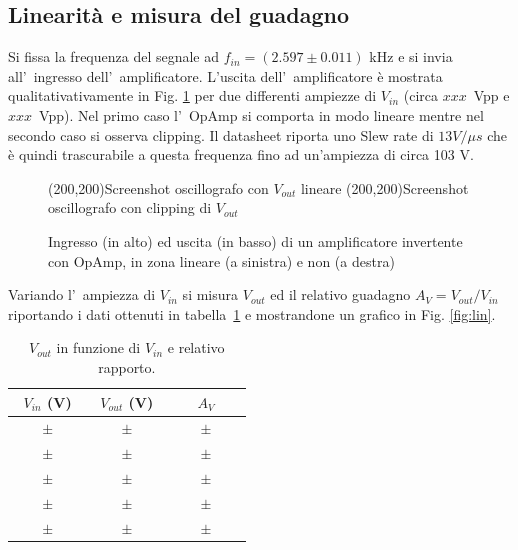 \documentclass[10pt,a4paper]{article}
\newcommand{\exn}{\phantom{xxx}}
\begin{document}
	\subsection{Linearit\`a e misura del guadagno}
	Si fissa la frequenza del segnale ad $f_{in} = (2.597 \pm 0.011)$ kHz e si invia all'~ingresso dell'~amplificatore.	L'uscita dell'~amplificatore \`e mostrata qualitativativamente in Fig. \ref{fig:oscinv} per due 
	differenti ampiezze di $V_{in}$ (circa $xxx$~Vpp e $xxx$~Vpp). 
	Nel primo caso l'~OpAmp si comporta in modo lineare mentre nel secondo caso si osserva clipping. Il datasheet riporta uno Slew rate di $13 V/\mu s$ che è quindi trascurabile a questa frequenza fino ad un'ampiezza di circa 103 V.
	\begin{figure}[h]
		\begin{center}
			\framebox(200,200){Screenshot oscillografo con $V_{out}$ lineare}
			\framebox(200,200){Screenshot oscillografo con clipping di $V_{out}$}
		\end{center}
		\caption{\small Ingresso (in alto) ed uscita (in basso) di un amplificatore invertente con OpAmp, in 
			zona lineare (a sinistra) e non (a destra)}
		\label{fig:oscinv}
	\end{figure}
	
	Variando l'~ampiezza di $V_{in}$ si misura $V_{out}$ ed il relativo guadagno $A_V=V_{out}/V_{in}$ riportando i dati ottenuti in tabella~\ref{tab:guadagno} 
	e mostrandone un grafico in Fig. \ref{fig:lin}. 
	
	\begin{table}[h]
		\caption{$V_{out}$ in funzione di $V_{in}$ e relativo rapporto.}
		\label{tab:guadagno}
		\begin{center}
			\begin{tabular}{|c|c|c|}
				\hline
				$V_{in}$ (V) & $V_{out}$ (V)  & $A_V$ \\
				\hline
				\hline
				$\exn \pm \exn $ & $\exn \pm \exn $ & $\exn \pm \exn$ \\
				\hline
				$\exn \pm \exn $ & $\exn \pm \exn $ & $\exn \pm \exn $ \\
				\hline
				$\exn \pm \exn $ & $\exn \pm \exn $ & $\exn \pm \exn $ \\
				\hline
				$\exn \pm \exn $ & $\exn \pm \exn $ & $\exn \pm \exn $ \\
				\hline
				$\exn \pm \exn $ & $\exn \pm \exn $ & $\exn \pm \exn $ \\
				\hline
			\end{tabular}
		\end{center}
	\end{table}
	
\end{document}
